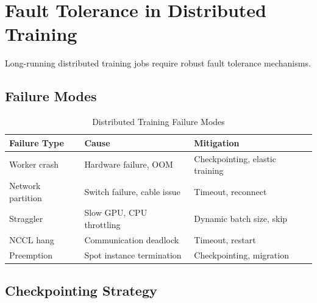 \section{Fault Tolerance in Distributed Training}

Long-running distributed training jobs require robust fault tolerance mechanisms.

\subsection{Failure Modes}

\begin{table}[h]
\centering
\caption{Distributed Training Failure Modes}
\label{tab:failure_modes}
\small
\begin{tabular}{@{}lp{4cm}p{4.5cm}@{}}
\toprule
\textbf{Failure Type} & \textbf{Cause} & \textbf{Mitigation} \\
\midrule
Worker crash & Hardware failure, OOM & Checkpointing, elastic training \\
Network partition & Switch failure, cable issue & Timeout, reconnect \\
Straggler & Slow GPU, CPU throttling & Dynamic batch size, skip \\
NCCL hang & Communication deadlock & Timeout, restart \\
Preemption & Spot instance termination & Checkpointing, migration \\
\bottomrule
\end{tabular}
\end{table}

\subsection{Checkpointing Strategy}

